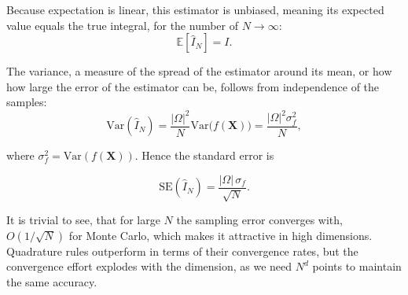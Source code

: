 
 Because expectation is linear, this estimator is unbiased, meaning its expected value equals the true integral, for the number of $N \to \infty$:
\begin{equation}
    \mathbb{E}[\hat I_N] = I. 
\end{equation}


 The variance, a measure of the spread of the estimator around its mean, or how how large the error of the estimator can be,
follows from independence of the samples:
\begin{equation}
    \mathrm{Var}(\hat I_N) = \frac{|\Omega|^2}{N} \mathrm{Var}\bigl(f(\mathbf{X})\bigr) = \frac{|\Omega|^2 \sigma_f^2}{N},
\end{equation}

where $\sigma_f^2 = \mathrm{Var}(f(\mathbf{X}))$. Hence the standard error is

\begin{equation}
    \mathrm{SE}(\hat I_N) = \frac{|\Omega|\,\sigma_f}{\sqrt{N}}.
\end{equation}

It is trivial to see, that for large $N$ the sampling error converges with, $O(1/\sqrt{N})$ for Monte Carlo, which makes it attractive in high dimensions.
Quadrature rules outperform in terms of their convergence rates, but the convergence effort explodes with the dimension, as we need $N^d$ points to maintain the same accuracy.

